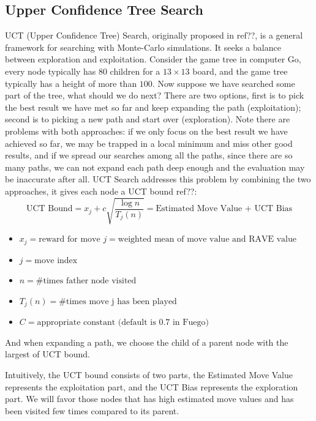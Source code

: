 \subsection{Upper Confidence Tree Search}
UCT (Upper Confidence Tree) Search, originally proposed in ref??, is a general framework for searching with Monte-Carlo simulations. It seeks a balance between exploration and exploitation. Consider the game tree in computer Go, every node typically has $80$ children for a $13\times 13$ board, and the game tree typically has a height of more than $100$. Now suppose we have searched some part of the tree, what should we do next? There are two options, first is to pick the best result we have met so far and keep expanding the path (exploitation); second is to picking a new path and start over (exploration). Note there are problems with both approaches: if we only focus on the best result we have achieved so far, we may be trapped in a local minimum and miss other good results, and if we spread our searches among all the paths, since there are so many paths, we can not expand each path deep enough and the evaluation may be inaccurate after all. UCT Search addresses this problem by combining the two approaches, it gives each node a UCT bound ref??:
\begin{equation}
\text{UCT Bound} = x_j + c \sqrt {\frac {\log n} {T_j(n)}} = \text{Estimated Move Value + UCT Bias}
\end{equation}
\begin{itemize}
\item $x_j = \text{reward for move $j$} = \text{weighted mean of move value and RAVE value}$
\item $j   = \text{move index}$
\item $n   =  \# \text{times father node visited}$
\item $T_j(n)  =  \# \text{times move j has been played}$
\item $C    =  \text{appropriate constant (default is $0.7$ in Fuego)}$
\end{itemize}

And when expanding a path, we choose the child of a parent node with the largest of UCT bound.

Intuitively, the UCT bound consists of two parts, the Estimated Move Value represents the exploitation part, and the UCT Bias represents the exploration part. We will favor those nodes that has high estimated move values and has been visited few times compared to its parent.

